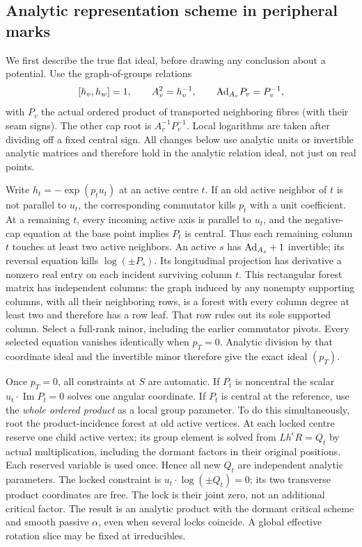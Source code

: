\subsection{Analytic representation scheme in peripheral marks}
\label{classic:sec:scheme}
We first describe the true flat ideal, before drawing any conclusion about
a potential. Use the graph-of-groups relations
\[
 [h_v,h_w]=1,\qquad A_v^2=h_v^{-1},\qquad
 {\rm Ad}_{A_v}P_v=P_v^{-1},
\]
with \(P_v\) the actual ordered product of transported neighboring fibres
(with their seam signs). The other cap root is
\(A_v^{-1}P_v^{-1}\). Local logarithms are taken after dividing off a
fixed central sign. All changes below use analytic units or invertible
analytic matrices and therefore hold in the analytic relation ideal,
not just on real points.

Write \(h_t=-\exp(p_tu_t)\) at an active centre \(t\). If an old active
neighbor of \(t\) is not parallel to \(u_t\), the corresponding
commutator kills \(p_t\) with a unit coefficient. At a remaining
\(t\), every incoming active axis is parallel to \(u_t\), and the
negative-cap equation at the base point implies \(P_t\) is central.
Thus each remaining column \(t\) touches at least two active
neighbors. An active \(s\) has \({\rm Ad}_{A_s}+1\) invertible; its
reversal equation kills \(\log(\pm P_s)\). Its longitudinal projection
has derivative a nonzero real entry on each incident surviving column
\(t\). This rectangular forest matrix has independent columns:
the graph induced by any nonempty supporting columns, with all their
neighboring rows, is a forest with every column degree at least two
and therefore has a row leaf. That row rules out its sole supported
column. Select a full-rank minor, including the earlier commutator
pivots. Every selected equation vanishes identically when \(p_T=0\).
Analytic division by that coordinate ideal and the invertible minor
therefore give the exact ideal \((p_T)\).

Once \(p_T=0\), all constraints at \(S\) are automatic. If \(P_t\)
is noncentral the scalar \(u_t\cdot\operatorname{Im}P_t=0\) solves
one angular coordinate. If \(P_t\) is central at the reference, use
the \emph{whole ordered product} as a local group parameter. To do
this simultaneously, root the product-incidence forest at old active
vertices. At each locked centre reserve one child active vertex;
its group element is solved from \(L h^\epsilon R=Q_t\) by actual
multiplication, including the dormant factors in their original
positions. Each reserved variable is used once. Hence all new
\(Q_t\) are independent analytic parameters. The locked constraint
is \(u_t\cdot\log(\pm Q_t)=0\); its two transverse product coordinates
are free. The lock is their joint zero, not an additional critical
factor. The result is an analytic product with the dormant critical
scheme and smooth passive \(\alpha\), even when several locks coincide.
A global effective rotation slice may be fixed at irreducibles.


